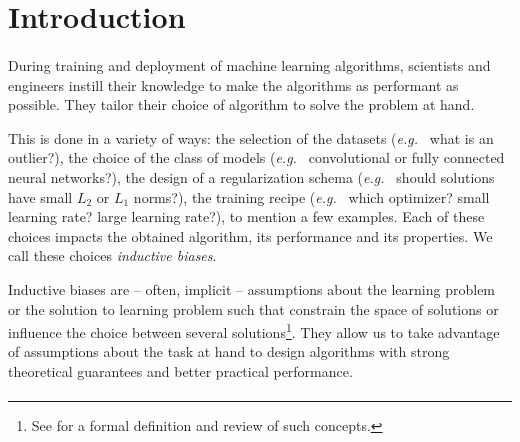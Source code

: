 
\section{Introduction}


\paragraph{}
During training and deployment of machine learning algorithms, scientists and engineers instill their knowledge to make the algorithms as performant as possible. They tailor their choice of algorithm to solve the problem at hand.

This is done in a variety of ways: the selection of the datasets (\emph{e.g.\ } what is an outlier?), the choice of the class of models (\emph{e.g.\ } convolutional or fully connected neural networks?), the design of a regularization schema (\emph{e.g.\ } should solutions have small $L_2$ or $L_1$ norms?), the training recipe (\emph{e.g.\ } which optimizer? small learning rate? large learning rate?), to mention a few examples. Each of these choices impacts the obtained algorithm, its performance and its properties. We call these choices \emph{inductive biases}.

Inductive biases are -- often, implicit -- assumptions about the learning problem or the solution to learning problem such that constrain the space of solutions or influence the choice between several solutions\footnote{See \citet{mitchell-inductive,1806.01261} for a formal definition and review of such concepts.}. They allow us to take advantage of assumptions about the task at hand to design algorithms with strong theoretical guarantees and better practical performance.

\paragraph{}

